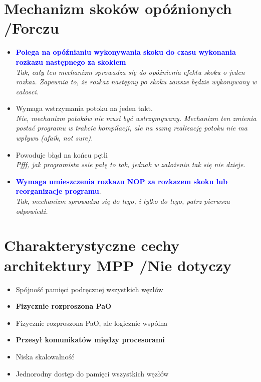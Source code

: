 \documentclass[a4paper,twoside]{article}
\begin{document}
\section{Mechanizm skoków opóźnionych {\small /Forczu}}
	\begin{itemize}
    \item \textcolor{Blue}{\textbf{Polega na opóźnianiu wykonywania skoku do czasu wykonania rozkazu następnego za skokiem}}\\
    {\small \emph{Tak, cały ten mechanizm sprowadza się do opóźnienia efektu skoku o jeden rozkaz. Zapewnia to, że rozkaz następny po skoku zawsze będzie wykonywany w całosci.}}
    \item Wymaga wstrzymania potoku na jeden takt.\\
    {\small \emph{Nie, mechanizm potoków nie musi być wstrzymywany. Mechanizm ten zmienia postać programu w trakcie kompilacji, ale na samą realizację potoku nie ma wpływu (afaik, not sure).}}
    \item Powoduje błąd na końcu pętli\\
    {\small \emph{Pfff, jak programista ssie pałę to tak, jednak w założeniu tak się nie dzieje.}}
    \item \textcolor{Blue}{\textbf{Wymaga umieszczenia rozkazu NOP za rozkazem skoku lub reorganizacje programu}}.\\
    {\small \emph{Tak, mechanizm sprowadza się do tego, i tylko do tego, patrz pierwsza odpowiedź.}}
    \end{itemize}
    
\section{Charakterystyczne cechy architektury MPP {\small /Nie dotyczy}}
	\begin{itemize}
    \item Spójność pamięci podręcznej wszystkich węzłów
    \item \textbf{Fizycznie rozproszona PaO}
    \item Fizycznie rozproszona PaO, ale logicznie wspólna
    \item \textbf{Przesył komunikatów między procesorami}
    \item Niska skalowalność
    \item Jednorodny dostęp do pamięci wszystkich węzłów
    \end{itemize}

\end{document}
